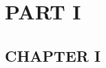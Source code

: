 \documentclass[12pt,fleqn]{book}
\let\origdoublepage\cleardoublepage
\newcommand{\clearemptydoublepage}{%
    \clearpage
    {\pagestyle{empty}\origdoublepage}%
}
\let\cleardoublepage\clearemptydoublepage
\begin{document}
  \begin{titlepage}
   
  \end{titlepage}

\frontmatter

{

%
%




\cleardoublepage
\tableofcontents

\cleardoublepage
{}

}

\mainmatter

% 





\part{PART I}

\chapter{CHAPTER I}



\appendix
\end{document}
